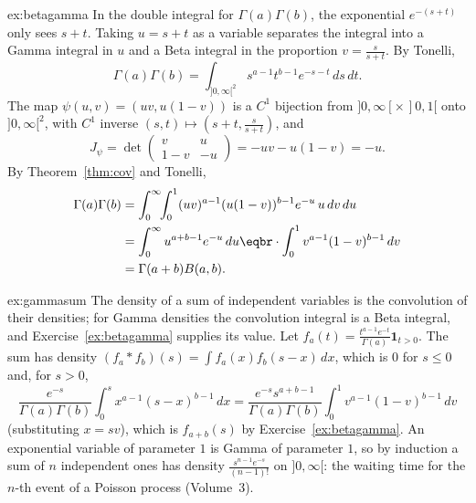 \begin{solution}{ex:betagamma}
\idea In the double integral for $\Gamma(a)\Gamma(b)$, the exponential $e^{-(s+t)}$ only sees $s+t$. Taking $u=s+t$ as a variable separates the integral into a Gamma integral in $u$ and a Beta integral
in the proportion $v=\frac s{s+t}$.
\writeup By Tonelli,
\[\Gamma(a)\Gamma(b)=\int_{]0,\infty[^2}s^{a-1}t^{b-1}e^{-s-t}\,ds\,dt.\]
The map $\psi(u,v)=(uv,u(1-v))$ is a $C^1$ bijection from $]0,\infty[\times\,]0,1[$ onto $]0,\infty[^2$, with $C^1$ inverse
$(s,t)\mapsto(s+t,\frac s{s+t})$, and
\[J_\psi=\det\begin{pmatrix}v&u\\1-v&-u\end{pmatrix}=-uv-u(1-v)=-u.\]
By Theorem~\ref{thm:cov} and Tonelli,
\[\begin{aligned}\Gamma(a)\Gamma(b)&=\int_0^\infty\!\!\int_0^1(uv)^{a-1}(u(1-v))^{b-1}e^{-u}\,u\,dv\,du\\&=\int_0^\infty u^{a+b-1}e^{-u}\,du\eqbr\cdot\int_0^1v^{a-1}(1-v)^{b-1}\,dv\\&=\Gamma(a+b)B(a,b).\end{aligned}\]
\end{solution}

\begin{solution}{ex:gammasum}
\idea The density of a sum of independent variables is the convolution of their densities; for Gamma densities the convolution integral is a Beta integral, and Exercise~\ref{ex:betagamma}
supplies its value.
\writeup Let $f_a(t)=\frac{t^{a-1}e^{-t}}{\Gamma(a)}\mathbf 1_{t>0}$. The sum has density $(f_a*f_b)(s)=\int f_a(x)f_b(s-x)\,dx$, which is $0$ for $s\le0$ and, for $s>0$,
\[\frac{e^{-s}}{\Gamma(a)\Gamma(b)}\int_0^sx^{a-1}(s-x)^{b-1}\,dx=\frac{e^{-s}s^{a+b-1}}{\Gamma(a)\Gamma(b)}\int_0^1v^{a-1}(1-v)^{b-1}\,dv\]
(substituting $x=sv$), which is $f_{a+b}(s)$ by Exercise~\ref{ex:betagamma}. An exponential variable of parameter $1$ is Gamma of parameter $1$, so by induction a sum of $n$ independent ones has
density $\frac{s^{n-1}e^{-s}}{(n-1)!}$ on $]0,\infty[$: the waiting time for the $n$-th event of a Poisson process (Volume~3).
\end{solution}

